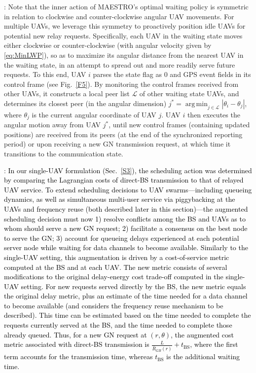 \documentclass[12pt, draftcls, onecolumn]{IEEEtran}
\theoremstyle{plain}
\theoremstyle{definition}
\theoremstyle{remark}
\DeclareMathOperator*{\argmin}{arg\,min}
\newcommand\hlt[1]{\textcolor{black}{#1}}
\begin{document}
: Note that the inner action of MAESTRO's optimal waiting policy is symmetric in relation to clockwise and counter-clockwise angular UAV movements. For multiple UAVs, we leverage this symmetry to proactively position idle UAVs for potential new relay requests. Specifically, each UAV in the waiting state moves either clockwise or counter-clockwise (with angular velocity given by \eqref{eq:MinLWP}), so as to maximize its angular distance from the nearest UAV in the waiting state, in an attempt to spread out and more readily serve future requests. To this end, UAV $i$ parses the state flag as 0 and GPS event fields in its control frame (see Fig.~\ref{F5}). By monitoring the control frames received from other UAVs, it constructs a local peer list $\mathcal{L}$ of other waiting state UAVs, and determines its closest peer (in the angular dimension) $j^{*}{=}\argmin_{j{\in}\mathcal{L}}|\theta_{i}{-}\theta_{j}|$, where $\theta_{j}$ is the current angular coordinate of UAV $j$. UAV $i$ then executes the angular motion away from UAV $j^*$, until new control frames (containing updated positions) are received from its peers (at the end of the synchronized reporting period) or upon receiving a new GN transmission request, at which time it transitions to the communication state.

\noindent{\textbf{\hlt{Consensus-driven Conflict Resolution}}}: \hlt{In our single-UAV formulation (Sec.~\ref{S3}), the scheduling action was determined by comparing the Lagrangian costs of direct-BS transmission to that of relayed UAV service. To extend scheduling decisions to UAV swarms---including queueing dynamics, as well as simultaneous multi-user service via piggybacking at the UAVs and frequency reuse (both described later in this section)---the augmented scheduling decision must now 1) resolve conflicts among the BS and UAVs as to whom should serve a new GN request; 2) facilitate a consensus on the best node to serve the GN; 3) account for queueing delays experienced at each potential server node while waiting for data channels to become available. Similarly to the single-UAV setting, this augmentation is driven by a cost-of-service metric computed at the BS and at each UAV. The new metric consists of several modifications to the original delay-energy cost trade-off computed in the single-UAV setting. For new requests served directly by the BS, the new metric equals the original delay metric, plus an estimate of the time needed for a data channel to become available (and considers the frequency reuse mechanism to be described). This time can be estimated based on the time needed to complete the requests currently served at the BS, and the time needed to complete those already queued. Thus, for a new GN request at $(r,\theta)$, the augmented cost metric associated with direct-BS transmission is $\frac{L}{\bar{R}_{GB}(r)}{+}t_{\mathrm{BS}}$, where the first term accounts for the transmission time, whereas $t_{\mathrm{BS}}$ is the additional waiting time.}
\end{document}
